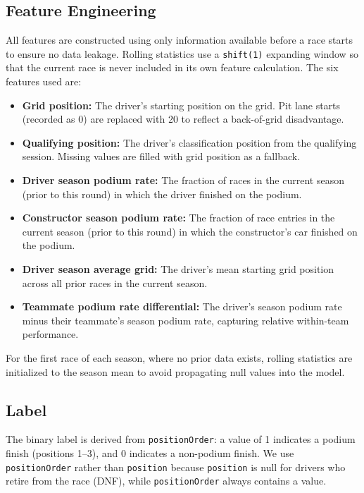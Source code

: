 \documentclass[11pt]{article}
\begin{document}
\subsection{Feature Engineering}
 
All features are constructed using only information available before a race starts to ensure no data leakage. Rolling statistics use a \texttt{shift(1)} expanding window so that the current race is never included in its own feature calculation. The six features used are:
 
\begin{itemize}
    \item \textbf{Grid position:} The driver's starting position on the grid. Pit lane starts (recorded as 0) are replaced with 20 to reflect a back-of-grid disadvantage.
    \item \textbf{Qualifying position:} The driver's classification position from the qualifying session. Missing values are filled with grid position as a fallback.
    \item \textbf{Driver season podium rate:} The fraction of races in the current season (prior to this round) in which the driver finished on the podium.
    \item \textbf{Constructor season podium rate:} The fraction of race entries in the current season (prior to this round) in which the constructor's car finished on the podium.
    \item \textbf{Driver season average grid:} The driver's mean starting grid position across all prior races in the current season.
    \item \textbf{Teammate podium rate differential:} The driver's season podium rate minus their teammate's season podium rate, capturing relative within-team performance.
\end{itemize}
 
For the first race of each season, where no prior data exists, rolling statistics are initialized to the season mean to avoid propagating null values into the model.
 
\subsection{Label}
 
The binary label is derived from \texttt{positionOrder}: a value of 1 indicates a podium finish (positions 1--3), and 0 indicates a non-podium finish. We use \texttt{positionOrder} rather than \texttt{position} because \texttt{position} is null for drivers who retire from the race (DNF), while \texttt{positionOrder} always contains a value.
 
\end{document}
